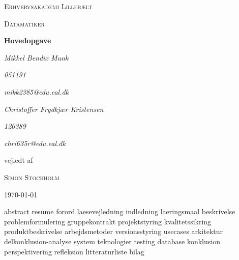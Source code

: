 \documentclass[a4paper, 11pt, danish]{article}
\begin{document}
\begin{titlepage}
    \centering
    {\scshape\LARGE Erhvervsakademi Lillebælt \par}
    \vspace{1cm}
    {\scshape\Large Datamatiker\par}
    \vspace{1.5cm}
    {\huge\bfseries Hovedopgave\par}
    \vspace{2cm}
    {\Large\itshape Mikkel Bendix Munk\par}
    {\small\itshape 051191\par}
    {\small\itshape mikk2385@edu.eal.dk\par}
    {\Large\itshape Christoffer Frydkjær Kristensen\par}
    {\small\itshape 120389\par}
    {\small\itshape chri635r@edu.eal.dk\par}
    \vfill
    vejledt af\par
    \textsc{Simon Stochholm}

    \vfill

    {\large \today\par}
\end{titlepage}
\tableofcontents{}
\newpage
{abstract}
{resume}
{forord}
{laesevejledning}
{indledning}
{laeringsmaal}
{beskrivelse}
{problemformulering}
{gruppekontrakt}
{projektstyring}
{kvalitetssikring}
{produktbeskrivelse}
{arbejdsmetoder}
{versionsstyring}
{usecases}
{arkitektur}
{delkonklusion-analyse}
{system}
{teknologier}
{testing}
{database}
{konklusion}
{perspektivering}
{refleksion}
{litteraturliste}
{bilag}
\end{document}
